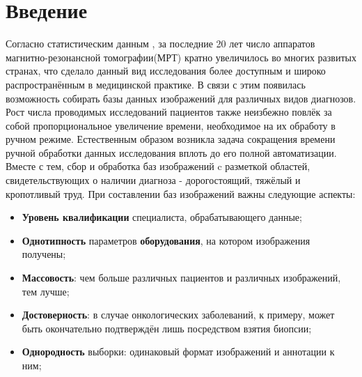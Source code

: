 \chapter*{Введение}							%

Согласно статистическим данным \cite{Stats}, за последние 20 лет число аппаратов магнитно-резонансной томографии(МРТ) кратно увеличилось во многих развитых странах, что  сделало данный вид исследования более доступным и широко распространённым в медицинской практике. В связи с этим появилась возможность собирать базы данных изображений для различных видов диагнозов.
\\
\indent Рост числа проводимых исследований пациентов также неизбежно повлёк за собой пропорциональное увеличение времени, необходимое на их обработу в ручном режиме. Естественным образом возникла задача сокращения времени ручной обработки данных исследования вплоть до его полной автоматизации.
\\
\indent Вместе с тем, сбор и обработка баз изображений c разметкой областей, свидетельствующих о наличии диагноза - дорогостоящий, тяжёлый и кропотливый труд. При составлении баз изображений важны следующие аспекты:

\begin{itemize}
    \item {\bf Уровень квалификации} специалиста, обрабатывающего данные;
    \item {\bf Однотипность} параметров {\bf оборудования}, на котором изображения получены;
    \item {\bf Массовость}: чем больше различных пациентов и различных изображений, тем лучше;
    \item {\bf Достоверность}: в случае онкологических заболеваний, к примеру, может быть окончательно подтверждён лишь посредством взятия биопсии;
    \item {\bf Однородность} выборки: одинаковый формат изображений и аннотации к ним;
\end{itemize}

